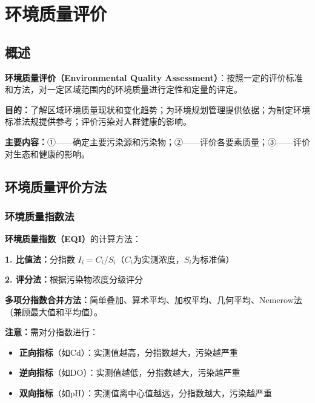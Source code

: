 \chapter{环境质量评价}
\setcounter{chapter}{11}

\section{概述}

\begin{defbox}
\textbf{环境质量评价（Environmental Quality Assessment）}：按照一定的评价标准和方法，对一定区域范围内的环境质量进行定性和定量的评定。
\end{defbox}

\textbf{目的：}了解区域环境质量现状和变化趋势；为环境规划管理提供依据；为制定环境标准法规提供参考；评价污染对人群健康的影响。

\textbf{主要内容：}①——确定主要污染源和污染物；②——评价各要素质量；③——评价对生态和健康的影响。

\section{环境质量评价方法}

\subsection{环境质量指数法}

\begin{keybox}
\textbf{环境质量指数（EQI）}的计算方法：

\textbf{1. 比值法：}分指数 $I_i = C_i / S_i$（$C_i$为实测浓度，$S_i$为标准值）

\textbf{2. 评分法：}根据污染物浓度分级评分

\textbf{多项分指数合并方法：}简单叠加、算术平均、加权平均、几何平均、Nemerow法（兼顾最大值和平均值）。

\textbf{注意：}需对分指数进行：
\begin{itemize}[leftmargin=*]
    \item \textbf{正向指标}（如Cd）：实测值越高，分指数越大，污染越严重
    \item \textbf{逆向指标}（如DO）：实测值越低，分指数越大，污染越严重
    \item \textbf{双向指标}（如pH）：实测值离中心值越远，分指数越大，污染越严重
\end{itemize}
\end{keybox}

